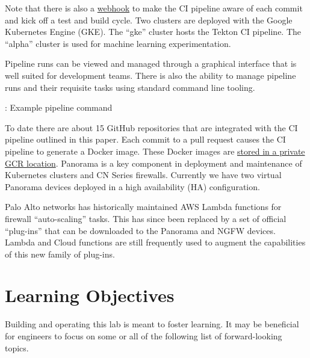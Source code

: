 \justifying
Note that there is also a \href{https://docs.github.com/en/developers/webhooks-and-events/webhooks/about-webhooks}{webhook} to make the CI pipeline
aware of each commit and kick off a test and build cycle.
\vspace{2mm}
\justifying
{}
\vspace{2mm}
\justifying
Two clusters are deployed with the Google Kubernetes Engine (GKE). The ``gke'' cluster hosts the Tekton CI pipeline.
The ``alpha'' cluster is used for machine learning experimentation.

\justifying
Pipeline runs can be viewed and managed through a graphical interface that is well suited for development teams. There is
also the ability to manage pipeline runs and their requisite tasks using standard command line tooling.

\begin{mybox}{\thetcbcounter: Example pipeline command}
	
\end{mybox}
\vspace{2mm}
\vspace{2mm}
\justifying
To date there are about 15 GitHub repositories that are integrated with the CI pipeline outlined in this paper. Each commit
to a pull request causes the CI pipeline to generate a Docker image. These Docker images 
are \href{https://cloud.google.com/container-registry/}{stored in a private GCR location}.
\vspace{2mm}
\vspace{2mm}
\justifying
Panorama is a key component in deployment and maintenance of Kubernetes clusters and CN Series firewalls. Currently we have
two virtual Panorama devices deployed in a high availability (HA) configuration.

\justifying
Palo Alto networks has historically maintained AWS Lambda functions for firewall ``auto-scaling'' tasks. This has since been
replaced by a set of official ``plug-ins'' that can be downloaded to the Panorama and NGFW devices. Lambda and Cloud functions
are still frequently used to augment the capabilities of this new family of plug-ins. 
\vspace{2mm}
\section{\label{sec:LO}Learning Objectives}
\vspace{2mm}
Building and operating this lab is meant to foster learning. It may be beneficial for engineers  to focus on some or all of the
following list of forward-looking topics.

